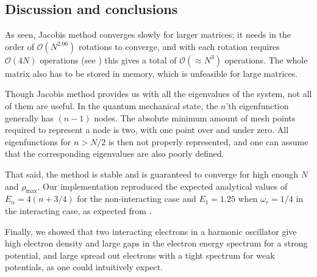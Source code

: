\documentclass[10pt]{article}
\newcommand{\rhomax}{\rho_{\text{max}}}
\newcommand{\bigO}[1]{\mathcal{O}(#1)}
\begin{document}
\begin{multicols}{2}
\section{Discussion and conclusions}

As seen, Jacobis method converges slowly for larger matrices; it needs in
the order of $\bigO{N^{2.06}}$ rotations to converge, and with each
rotation requires $\bigO{4N}$ operations (see \cite{lectureNotes}) this
gives a total of $\bigO{\approx N^3}$ operations. The whole matrix also has
to be stored in memory, which is unfeasible for large matrices.

Though Jacobis method provides us with all the eigenvalues of the system,
not all of them are useful. In the quantum mechanical state, the $n$'th
eigenfunction generally has $(n-1)$ nodes. The absolute minimum amount of
mesh points required to represent a node is two, with one point over and
under zero. All eigenfunctions for $n>N/2$ is then not properly represented, and
one can assume that the corresponding eigenvalues are also poorly
defined.

That said, the method is stable and is guaranteed to converge for high enough
$N$ and $\rhomax$. Our implementation reproduced the expected analytical
values of $E_n = 4(n+3/4)$ for the non-interacting case and $E_1 = 1.25$
when $\omega_r = 1/4$ in the interacting case, as expected from
\cite{PhysRevA.48.3561}. 

Finally, we showed that two interacting electrons in a harmonic oscillator
give high electron density and large gaps in the electron energy spectrum
for a strong potential, and large spread out electrons with a tight
spectrum for weak potentials, as one could intuitively expect.



{}


\end{multicols}
\end{document}
